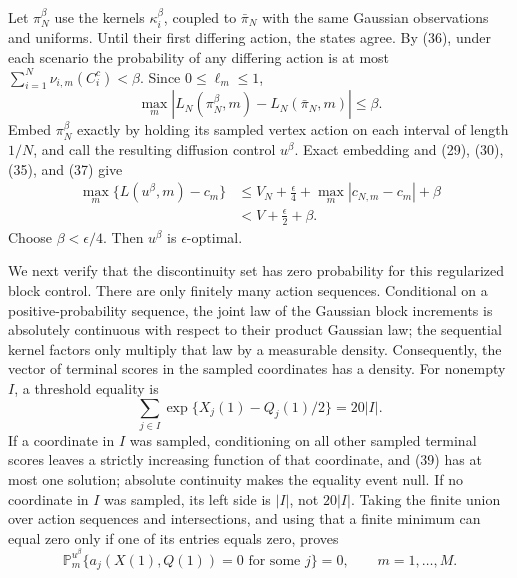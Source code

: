Let \(\pi_N^\beta\) use the kernels \(\kappa_i^\beta\), coupled to \(\bar\pi_N\) with the same Gaussian observations and uniforms.  Until their first differing action, the states agree.  By (36), under each scenario the probability of any differing action is at most \(\sum_{i=1}^N\nu_{i,m}(C_i^c)<\beta\).  Since \(0\leq\ell_m\leq1\),
\[
 \max_m|L_N(\pi_N^\beta,m)-L_N(\bar\pi_N,m)|\leq\beta.          \tag{37}
\]
Embed \(\pi_N^\beta\) exactly by holding its sampled vertex action on each interval of length \(1/N\), and call the resulting diffusion control \(u^\beta\).  Exact embedding and (29), (30), (35), and (37) give
\[
 \begin{aligned}
 \max_m\{L(u^\beta,m)-c_m\}
 &\leq V_N+\frac\epsilon4+\max_m|c_{N,m}-c_m|+\beta\\
 &<V+\frac\epsilon2+\beta.                                     \tag{38}
 \end{aligned}
\]
Choose \(\beta<\epsilon/4\).  Then \(u^\beta\) is \(\epsilon\)-optimal.

We next verify that the discontinuity set has zero probability for this regularized block control.  There are only finitely many action sequences.  Conditional on a positive-probability sequence, the joint law of the Gaussian block increments is absolutely continuous with respect to their product Gaussian law; the sequential kernel factors only multiply that law by a measurable density.  Consequently, the vector of terminal scores in the sampled coordinates has a density.  For nonempty \(I\), a threshold equality is
\[
 \sum_{j\in I}\exp\{X_j(1)-Q_j(1)/2\}=20|I|.                   \tag{39}
\]
If a coordinate in \(I\) was sampled, conditioning on all other sampled terminal scores leaves a strictly increasing function of that coordinate, and (39) has at most one solution; absolute continuity makes the equality event null.  If no coordinate in \(I\) was sampled, its left side is \(|I|\), not \(20|I|\).  Taking the finite union over action sequences and intersections, and using that a finite minimum can equal zero only if one of its entries equals zero, proves
\[
 \mathbb P_m^{u^\beta}\{a_j(X(1),Q(1))=0
 \text{ for some }j\}=0,
 \qquad m=1,\ldots,M.                                           \tag{40}
\]

